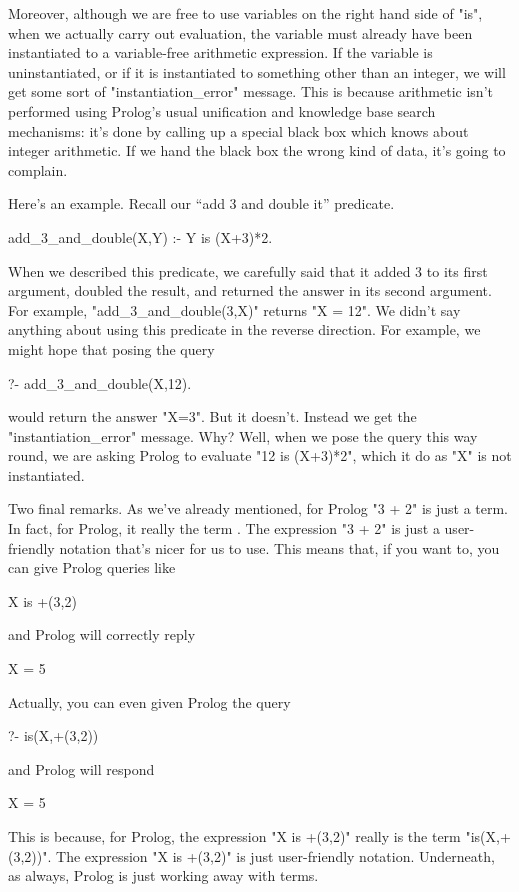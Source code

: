 Moreover, although we are free to use variables on the right hand side
of "is", when we actually carry out evaluation, the variable must
already have been instantiated to a variable-free arithmetic
expression.  If the variable is uninstantiated, or if it is
instantiated to something other than an integer, we will get some sort
of "instantiation\_error" message.  This is because arithmetic isn't
performed using Prolog's usual unification and knowledge base search
mechanisms: it's done by calling up a special black box which knows
about integer arithmetic.  If we hand the black box the wrong kind of
data, it's going to complain.

Here's an example. Recall our ``add 3 and double it''
predicate.
\begin{LPNcodedisplay}
add_3_and_double(X,Y) :- Y is (X+3)*2.
\end{LPNcodedisplay}
When we described this predicate, we carefully said that it added 3 to
its first argument, doubled the result, and returned the answer in its
second argument.  For example, "add\_3\_and\_double(3,X)" returns
"X = 12".  We didn't say anything about using this predicate in
the reverse direction.  For example, we might hope that posing the
query
\begin{LPNcodedisplay}
?- add_3_and_double(X,12).
\end{LPNcodedisplay}
would return the answer "X=3".   But it doesn't. Instead we
get the "instantiation\_error" message.  Why?  Well, when we pose
the query this way round, we are asking Prolog to evaluate
"12 is (X+3)*2", which it  do as "X"
is not instantiated.

Two final remarks.  As we've already mentioned, for Prolog "3 + 2"
is just a term.  In fact, for Prolog, it really  the term
.  The expression "3 + 2" is just a user-friendly
notation that's nicer for us to use.  This means that, if you
want to, you can give Prolog queries like
\begin{LPNcodedisplay}
X is +(3,2)
\end{LPNcodedisplay}
and Prolog will correctly reply
\begin{LPNcodedisplay}
X = 5
\end{LPNcodedisplay}
Actually, you can even given Prolog the query
\begin{LPNcodedisplay}
?- is(X,+(3,2))
\end{LPNcodedisplay}
and Prolog will respond
\begin{LPNcodedisplay}
X = 5
\end{LPNcodedisplay}
This is because, for Prolog, the expression "X is +(3,2)" really is
the term "is(X,+(3,2))".  The expression "X is +(3,2)" is just
user-friendly notation.  Underneath, as always, Prolog is just working
away with terms.


